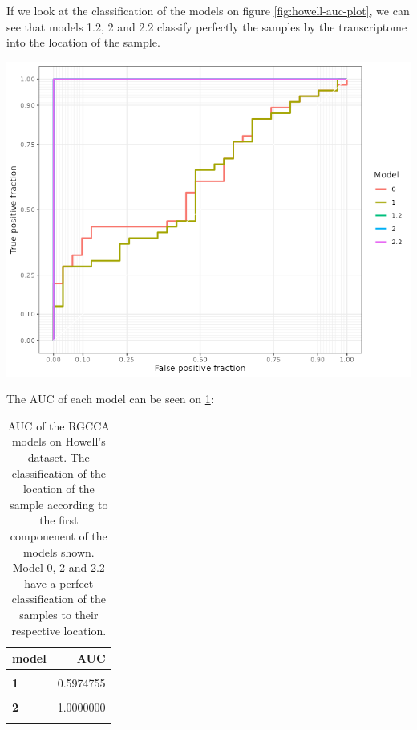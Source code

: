\documentclass[
  a4paper,
]{book}
\let\origfigure\figure
\let\endorigfigure\endfigure
\renewenvironment{figure}[1][2] {
    \expandafter\origfigure\expandafter[!ht]
} {
    \endorigfigure
}
\begin{document}
If we look at the classification of the models on figure \ref{fig:howell-auc-plot}, we can see that models 1.2, 2 and 2.2 classify perfectly the samples by the transcriptome into the location of the sample.

\begin{figure}
\includegraphics[width=1\linewidth]{images/howell-rgcca-auc} \caption[AUC of the RGCCA models on Howell's dataset.]{AUC of the RGCCA models on Howell's dataset. The classification of the location of the sample according to the first componenent of the models shown.}\label{fig:howell-auc-plot}
\end{figure}

The AUC of each model can be seen on \ref{tab:howell-auc}:

\begin{table}[H]

\caption[AUC of the RGCCA models on Howell's dataset]{\label{tab:howell-auc}AUC of the RGCCA models on Howell's dataset. The classification of the location of the sample according to the first componenent of the models shown. Model 0, 2 and 2.2 have a perfect classification of the samples to their respective location.}
\centering
\begin{tabular}[t]{|>{}l|>{}r|}
\hline
\textbf{model} & \textbf{AUC}\\
\hline
\textbf{\cellcolor{gray!6}{0}} & \cellcolor{gray!6}{0.6255259}\\
\hline
\textbf{1} & 0.5974755\\
\hline
\textbf{\cellcolor{gray!6}{1.2}} & \cellcolor{gray!6}{1.0000000}\\
\hline
\textbf{2} & 1.0000000\\
\hline
\textbf{\cellcolor{gray!6}{2.2}} & \cellcolor{gray!6}{1.0000000}\\
\hline
\end{tabular}
\end{table}
\end{document}
